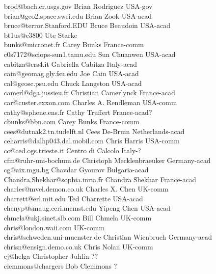 \begin{tabbing}
brod@bach.cr.usgs.gov \> Brian Rodriguez \>  USA-gov\\
brian@geo2.space.swri.edu \> Brian Zook \> USA-acad\\
bruce@terror.Stanford.EDU \> Bruce Beaudoin \> USA-acad\\
bt1us@c3800 \> Ute Starke \>\\
bunks@micronet.fr \> Carey Bunks \> France-comm\\
c0s7172@sciops-sun1.tamu.edu \> Sun Chuanwen \> USA-acad\\
cabitza@crs4.it \>  Gabriella Cabitza  \> Italy-acad\\
cain@geomag.gly.fsu.edu \> Joe Cain \>  USA-acad\\
cal@geosc.psu.edu \> Chuck Langston \> USA-acad\\
camerl@dga.jussieu.fr \> Christian Camerlynck \> France-acad\\
car@custer.exxon.com  \> Charles A. Rendleman   \> USA-comm  \\
cathy@sphene.ens.fr \> Cathy Truffert \>  France-acad?\\
cbunks@bbn.com \> Carey Bunks \> France-comm\\
cees@dutnak2.tn.tudelft.nl \> Cees De-Bruin \> Netherlands-acad \\
ceharris@dalhp043.dal.mobil.com \> Chris Harris \> USA-comm\\
cc@ced.ogs.trieste.it \>  Centro di Calcolo \> Italy-?\\
cfm@ruhr-uni-bochum.de \> Christoph Mecklenbraeuker \> Germany-acad\\
cg@aix.mgu.bg \> Chavdar Gyourov \> Bulgaria-acad\\
Chandra.Shekhar@sophia.inria.fr \> Chandra Shekhar \> France-acad\\
charles@mvel.demon.co.uk \> Charles X. Chen \> UK-comm\\
charrett@erl.mit.edu \> Ted Charrette \>  USA-acad\\
chenyp@smaug.ceri.memst.edu \> Yipeng Chen \> USA-acad\\
chmela@ukj.sinet.slb.com \> Bill Chmela \> UK-comm \\
chris@london.waii.com  \>    \> UK-comm\\
chris@schweden.uni-muenster.de \> Christian Wienbruch \> Germany-acad\\
chrisn@ensign.demo.co.uk \> Chris Nolan \> UK-comm\\
cj@helga \> Christopher Juhlin \> ??\\
clemmons@chargers \> Bob Clemmons \> ?\\

\end{tabbing}
